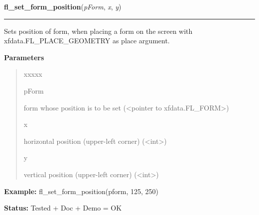 \hspace{.8\funcindent}\begin{boxedminipage}{\funcwidth}

    \raggedright \textbf{fl\_set\_form\_position}(\textit{pForm}, \textit{x}, \textit{y})

    \vspace{-1.5ex}

    \rule{\textwidth}{0.5\fboxrule}
\setlength{\parskip}{2ex}
    Sets position of form, when placing a form on the screen with 
    xfdata.FL\_PLACE\_GEOMETRY as place argument.

\setlength{\parskip}{1ex}
      \textbf{Parameters}
      \vspace{-1ex}

      \begin{quote}
        \begin{Ventry}{xxxxx}

          \item[pForm]

          form whose position is to be set ({\textless}pointer to 
          xfdata.FL\_FORM{\textgreater})

          \item[x]

          horizontal position (upper-left corner) 
          ({\textless}int{\textgreater})

          \item[y]

          vertical position (upper-left corner) 
          ({\textless}int{\textgreater})

        \end{Ventry}

      \end{quote}

\textbf{Example:} fl\_set\_form\_position(pform, 125, 250)



\textbf{Status:} Tested + Doc + Demo = OK



    \end{boxedminipage}

    \label{xformslib:library:fl_set_form_title}

    \vspace{0.5ex}


